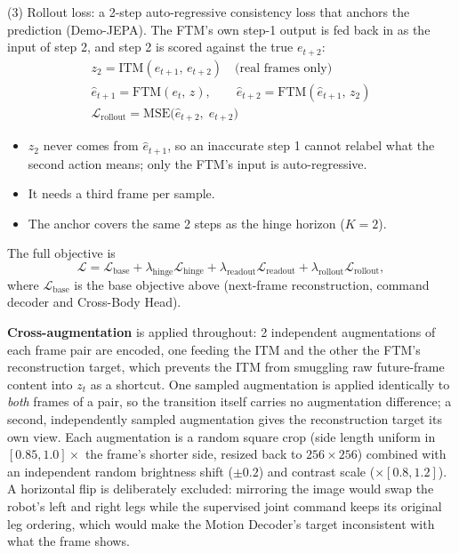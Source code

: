\documentclass[12pt,a4paper,oneside]{report}
\begin{document}
\newpage
\noindent (3) Rollout loss: a 2-step auto-regressive consistency loss that anchors the prediction
(Demo-JEPA). The FTM's own step-1 output is fed back in as the input of step 2, and step 2 is scored against the true
$e_{t+2}$:
\begin{gather}
z_2 = \mathrm{ITM}(e_{t+1},\, e_{t+2}) \quad \text{(real frames only)} \\
\hat e_{t+1} = \mathrm{FTM}(e_t,\, z), \qquad \hat e_{t+2} = \mathrm{FTM}(\hat e_{t+1},\, z_2) \\
\mathcal{L}_{\text{rollout}} = \mathrm{MSE}\big(\hat e_{t+2},\; e_{t+2}\big)
\end{gather}
\begin{itemize}[label=--]
\item $z_2$ never comes from $\hat e_{t+1}$, so an inaccurate step 1 cannot relabel what the second action means; only
  the FTM's input is auto-regressive.
\item It needs a third frame per sample.
\item The anchor covers the same 2 steps as the hinge horizon ($K=2$).
\end{itemize}

\noindent The full objective is
\begin{equation}
\mathcal{L} = \mathcal{L}_{\text{base}} + \lambda_{\text{hinge}}\mathcal{L}_{\text{hinge}}
+ \lambda_{\text{readout}}\mathcal{L}_{\text{readout}} + \lambda_{\text{rollout}}\mathcal{L}_{\text{rollout}},
\end{equation}
where $\mathcal{L}_{\text{base}}$ is the base objective above (next-frame reconstruction, command decoder and Cross-Body Head).

\textbf{Cross-augmentation} is applied throughout: 2 independent augmentations of each frame pair are encoded,
one feeding the ITM and the other the FTM's reconstruction target, which prevents the ITM from smuggling raw
future-frame content into $z_t$ as a shortcut. One sampled augmentation is applied identically to \emph{both}
frames of a pair, so the transition itself carries no augmentation difference; a second, independently sampled
augmentation gives the reconstruction target its own view. Each augmentation is a random square crop (side length
uniform in $[0.85, 1.0]\times$ the frame's shorter side, resized back to $256\times256$) combined with an
independent random brightness shift ($\pm0.2$) and contrast scale ($\times[0.8, 1.2]$). A horizontal flip is
deliberately excluded: mirroring the image would swap the robot's left and right legs while the supervised joint
command keeps its original leg ordering, which would make the Motion Decoder's target inconsistent with what the
frame shows.
\end{document}
